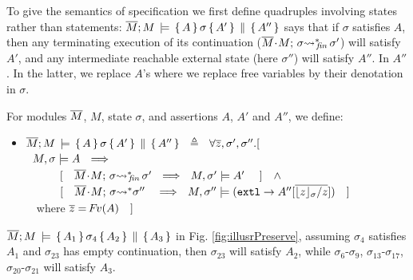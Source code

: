  



\label{ssect:sem}

  
To give the semantics of specification we first {define quadruples involving states rather than statements}:
${\overline{M}; M\, \models \, \{\, A\,\}\, \sigma \, \{\, A'\,\} \,\parallel\, \{\, A''\,\}  }$ 
  says that   if $\sigma$ satisfies $A$, then any terminating execution of its continuation (${ \overline{M}\!\cdot\! M;\, {\sigma} {\rightsquigarrow^*}\!\!_{\mathit{fin}}\, \sigma' }$) will satisfy $A'$, and
 any intermediate reachable external state (here $\sigma''$) will satisfy $A''$. 
In  $A''$. In the latter, we replace $A$'s
where we replace  free variables by their denotation in $\sigma$.

 
\begin{definition} \label{def:hoare:sem}
For modules $\overline{M}$, $M$, state $\sigma$, and assertions $A$, $A'$ and  $A''$, we define:
\begin{itemize}
\item
$ {\overline{M}; M\, \models \, \{\, A\,\}\, \sigma \, \{\, A'\,\} \,\parallel\, \{\, A''\,\}  } \ \ \triangleq \ \ \forall \overline{z}, \sigma',\sigma''.[
$  \\
$\strut \hspace{.2cm} M,  \sigma \models  {A}  
  \  \ \Longrightarrow$\\
 $\strut   \ \ \ \  \  \ \ \ \   [ \ \ \  {\leadstoBoundedStarFin { \Mtwo\madd M}{\sigma}  {\sigma'} }\ \ \Longrightarrow\ \   M,  \sigma' \models  \sdN{A'}  
 \ \ \ \  ] \ \ \ \wedge$\\
 $\strut   \ \ \ \  \  \ \ \ \   [ \ \  \ {\leadstoBoundedStar  {\Mtwo\madd M}{\sigma}  {\sigma''} }\ \  \ \Longrightarrow\   \   M,  \sigma'' \models  {(\extThis \rightarrow A''[\sdN{\overline{\interpret \sigma z/z}}])}\ \ \  ] $\\
 $\strut \hspace{.2cm}$ where  $ \overline z={\hspace{-1pt}F\hspace{-1pt}}v(A)  \ \ \ ]$ %
\end{itemize} 
\end{definition}

{\begin{example}
${\overline{M}; M\, \models \, \{\, A_1\,\}\, \sigma_{4} \, \{\, A_2\,\} \,\parallel\, \{\, A_3\,\}  }$  %
in Fig. \ref{fig:illusrPreserve}, %
assuming  $\sigma_4$ satisfies $A_1$ and $\sigma_{23}$ has empty continuation,    %
  then $\sigma_{23}$ will satisfy $A_2$, while $\sigma_6$-$\sigma_9$, $\sigma_{13}$-$\sigma_{17}$, $\sigma_{20}$-$\sigma_{21}$ will satisfy $A_3$.
 \end{example}}

